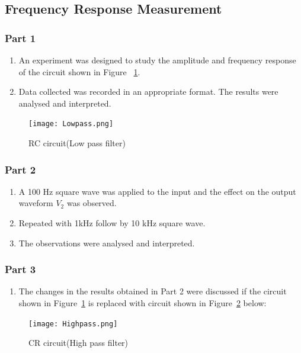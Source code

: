 \documentclass[a4paper, 12pt, english]{article}
\begin{document}
\subsection{Frequency Response Measurement}

\subsubsection{Part 1}

\begin{enumerate}
	\item An experiment was designed to study the amplitude and frequency response of the
	      circuit shown in Figure ~\ref{fig:Lowpass}.
	\item Data collected was recorded in an appropriate format. The results were analysed
	      and interpreted.
\end{enumerate}
\begin{figure}[!ht]
	\begin{center}
		\texttt{[image: Lowpass.png]}
	\end{center}
	\caption{\label{fig:Lowpass}RC circuit(Low pass filter)}
\end{figure}


\subsubsection{Part 2}

\begin{enumerate}
	\item A 100 Hz square wave was applied to the input and the effect on the output
	      waveform $V_2$ was observed.
	\item Repeated with 1kHz follow by 10 kHz square wave.
	\item The observations were analysed and interpreted.
\end{enumerate}

\subsubsection{Part 3}
\begin{enumerate}
	\item The changes in the results obtained in Part 2 were discussed if the circuit
	      shown in Figure~\ref{fig:Lowpass} is replaced with circuit shown in
	      Figure~\ref{fig:Highpass} below:
\end{enumerate}
\begin{figure}[!ht]
	\begin{center}
		\texttt{[image: Highpass.png]}
	\end{center}
	\caption{\label{fig:Highpass}CR circuit(High pass filter)}
\end{figure}
\end{document}
